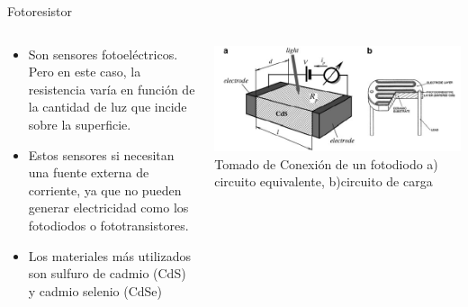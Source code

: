 \documentclass[aspectratio=169]{beamer}
\begin{document}
\begin{frame}{Fotoresistor}
    \begin{columns}[onlytextwidth]
        \begin{column}{0.55\textwidth}
            \begin{itemize}
                \item Son sensores fotoeléctricos. Pero en este caso, la resistencia varía en función de la cantidad de luz que incide sobre la superficie. 
                \item Estos sensores si necesitan una fuente externa de corriente, ya que no pueden generar electricidad como los fotodiodos o fototransistores.  
                \item Los materiales más utilizados son sulfuro de cadmio (CdS) y cadmio selenio (CdSe)
            \end{itemize}
        \end{column}
        \begin{column}{0.45\textwidth}
            \centering
            \includegraphics[width = 1\linewidth]{fig/Optica/fotoresistores.PNG}
            \tiny{Tomado de \cite{Fraden_2016}}
            \tiny{Conexión de un fotodiodo a) circuito equivalente, b)circuito de carga}
        \end{column}
    \end{columns}
\end{frame}
\end{document}
